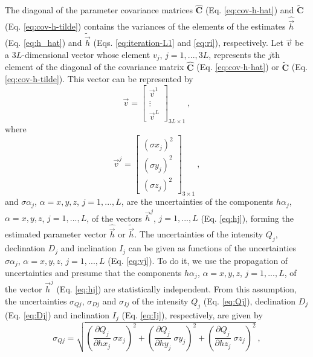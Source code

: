 \documentclass[journal abbreviation, npg]{copernicus}
\begin{document}
The diagonal of the parameter covariance matrices $\hat{\mathbf{C}}$ (Eq. \ref{eq:cov-h-hat}) and $\tilde{\mathbf{C}}$ (Eq. \ref{eq:cov-h-tilde}) contains the variances of the elements of the estimates $\hat{\vec{h}}$ (Eq. \ref{eq:h_hat}) and $\tilde{\vec{h}}$ (Eqs. \ref{eq:iteration-L1} and \ref{eq:ri}), respectively. Let $\vec{v}$ be a $3L$-dimensional vector whose element $v_{j}$, $j = 1, ..., 3L$, represents the $j$th element of the diagonal of the covariance matrix $\hat{\mathbf{C}}$ (Eq. \ref{eq:cov-h-hat}) or $\tilde{\mathbf{C}}$ (Eq. \ref{eq:cov-h-tilde}). This vector can be represented by
\begin{equation}
\vec{v} = 
\left[
\begin{array}{cc}
\vec{v}^{1} \\
\vdots \\
\vec{v}^{L}
\end{array}
\right]_{3L \times 1} \: ,
\label{eq:v}
\end{equation}
where
\begin{equation}
\vec{v}^{j} = 
\left[
\begin{array}{cc}
\left( \sigma x_{j} \right)^{2} \\
\left( \sigma y_{j} \right)^{2} \\
\left( \sigma z_{j} \right)^{2}
\end{array}
\right]_{3 \times 1} \: ,
\label{eq:vj}
\end{equation}
and ${\sigma \alpha}_{j}$, $\alpha = x, y, z$, $j = 1, ..., L$, are the uncertainties of the components ${h \alpha}_{j}$, $\alpha = x, y, z$, $j = 1, ..., L$, of the vectors $\vec{h}^{j}$, $j = 1, ..., L$ (Eq. \ref{eq:hj}), forming the estimated parameter vector $\hat{\vec{h}}$ or $\tilde{\vec{h}}$. The uncertainties of the intensity $Q_{j}$, declination $D_{j}$ and inclination $I_{j}$ can be given as functions of the uncertainties ${\sigma \alpha}_{j}$, $\alpha = x, y, z$, $j = 1, ..., L$ (Eq. \ref{eq:vj}). To do it, we use the propagation of uncertainties \citep{fornasini2008} and presume that the components ${h \alpha}_{j}$, $\alpha = x, y, z$, $j = 1, ..., L$, of the vector $\vec{h}^{j}$ (Eq. \ref{eq:hj}) are statistically independent. From this assumption, the uncertainties $\sigma_{Qj}$, $\sigma_{Dj}$ and $\sigma_{Ij}$ of the intensity $Q_{j}$ (Eq. \ref{eq:Qj}), declination $D_{j}$ (Eq. \ref{eq:Dj}) and inclination $I_{j}$ (Eq. \ref{eq:Ij}), respectively, are given by
\begin{equation}
\sigma_{Qj} = \sqrt{\left( \frac{\partial Q_{j}}{\partial hx_{j}} \: \sigma x_{j} \right)^{2} +
                    \left( \frac{\partial Q_{j}}{\partial hy_{j}} \: \sigma y_{j} \right)^{2} +
                    \left( \frac{\partial Q_{j}}{\partial hz_{j}} \: \sigma z_{j} \right)^{2}} \: ,
\label{eq:sigmaQj}
\end{equation}
\end{document}
